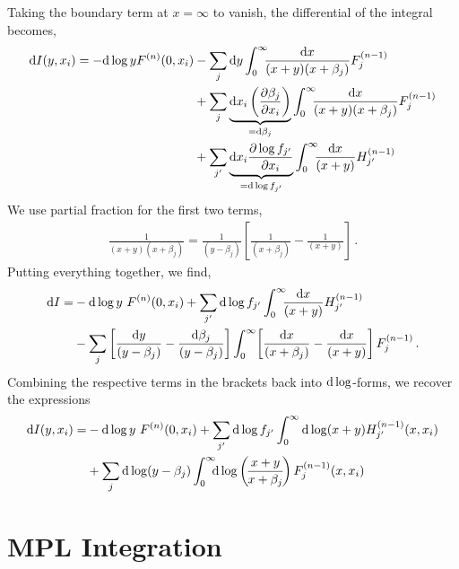 \documentclass[12pt]{article}
\begin{document}
Taking the boundary term at $x=\infty$ to vanish, the differential of the integral becomes,
\begin{align}
\begin{split}
 \dif  I(y,x_i)  = - \dif \log y F^{(n)}(0,x_i) & - \sum_j \dif y \int_0^\infty\!\!\!  \frac{\dif x}{(x+y)(x+\beta_j)} F^{(n-1)}_j \\
 							 & + \sum_j \underbrace{\dif x_i   \left(\frac{\partial \beta_j}{\partial x_i} \right)}_{=\dif \beta_j}  \int_0^\infty\!\!\!  \frac{\dif x}{(x+y)(x+\beta_j)} F^{(n-1)}_j  \\
							 & + \sum_{j'} \underbrace{\dif x_i \frac{\partial \log f_{j'}}{\partial x_i}}_{=\dif \log f_{j'}} \int_0^\infty\!\!\!  \frac{\dif x}{(x+y)} H^{(n-1)}_{j'}
\end{split}
\end{align}
We use partial fraction for the first two terms,
\begin{align}
\frac{1}{(x+y)(x+\beta_j)} = \frac{1}{(y-\beta_j)} \left[\frac{1}{(x+\beta_j)}-\frac{1}{(x+y)}\right]\,.
\end{align}
Putting everything together, we find,
\begin{align}
\begin{split}
 \mathrm{d} I =&  -\mathrm{d} \log y \ F^{(n)}(0,x_i) +  \sum_{j'} \mathrm{d} \log f_{j'} \int_0^\infty\!\!\!  \frac{\mathrm{d} x}{(x+y)} H^{(n-1)}_{j'} \\
       &  -\sum_j \left[\frac{\mathrm{d} y}{(y-\beta_j)} - \frac{\mathrm{d} \beta_j}{(y-\beta_j)}\right]  \int_0^\infty\!  \left[\frac{\mathrm{d} x}{(x+\beta_j)}-\frac{\mathrm{d} x}{(x+y)}\right] F^{(n-1)}_j \,.
\end{split}
\end{align}
Combining the respective terms in the brackets back into $\mathrm{d} \log$-forms, we recover the expressions 
\begin{align}
\begin{split}
  \mathrm{d} I(y,x_i) =& -\mathrm{d} \log y \ F^{(n)}(0,x_i)  +  \sum_{j'}  \mathrm{d} \log f_{j'} \int_0^\infty \mathrm{d} \log(x+y) H^{(n-1)}_{j'} (x,x_i) \\
        & +\sum_j \mathrm{d} \log(y-\beta_j) \int_0^\infty\!\!\! \mathrm{d} \log\left(\!\frac{x+y}{x+\beta_j}\!\right) F^{(n-1)}_j(x,x_i)
\end{split}
\end{align}

\section{MPL Integration}
\end{document}
